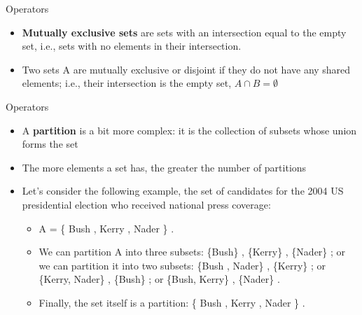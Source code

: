 \documentclass[
  ignorenonframetext,
]{beamer}
\providecommand{\tightlist}{%
  \setlength{\itemsep}{0pt}\setlength{\parskip}{0pt}}
\begin{document}
\begin{frame}{Operators}
\protect\hypertarget{operators-7}{}

\begin{itemize}
\item
  \textbf{Mutually exclusive sets} are sets with an intersection equal
  to the empty set, i.e., sets with no elements in their intersection.
\item
  Two sets A are mutually exclusive or disjoint if they do not have any
  shared elements; i.e., their intersection is the empty set, \(A∩B=∅\)
\end{itemize}

\end{frame}

\begin{frame}{Operators}
\protect\hypertarget{operators-8}{}

\begin{itemize}
\item
  A \textbf{partition} is a bit more complex: it is the collection of
  subsets whose union forms the set
\item
  The more elements a set has, the greater the number of partitions
\item
  Let's consider the following example, the set of candidates for the
  2004 US presidential election who received national press coverage:

  \begin{itemize}
  \tightlist
  \item
    A = \{ Bush , Kerry , Nader \} .\\
  \item
    We can partition A into three subsets: \{Bush\} , \{Kerry\} ,
    \{Nader\} ; or we can partition it into two subsets: \{Bush ,
    Nader\} , \{Kerry\} ; or \{Kerry, Nader\} , \{Bush\} ; or \{Bush,
    Kerry\} , \{Nader\} .
  \item
    Finally, the set itself is a partition: \{ Bush , Kerry , Nader \} .
  \end{itemize}
\end{itemize}

\end{frame}
\end{document}
